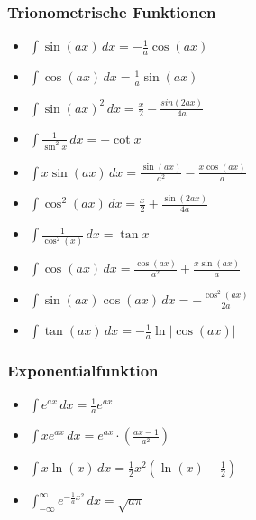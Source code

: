 \documentclass[25pt]{sciposter}
\begin{document}
\begin{multicols}{3}
\subsubsection*{Trionometrische Funktionen}
\begin{itemize}
	\item $\int \sin(ax) \,dx = -\frac{1}{a}\cos(ax)$
	\item $\int \cos(ax) \,dx = \frac{1}{a}\sin(ax)$
	\item $\int \sin(ax)^2 \,dx = \frac{x}{2} - \frac{sin(2ax)}{4a}$
	\item $\int \frac{1}{\sin^2 x} \,dx = -\cot x$
	\item $\int x \sin(ax) \,dx = \frac{\sin(ax)}{a^2} - \frac{x \cos(ax)}{a}$
	\item $\int \cos^2(ax) \,dx = \frac{x}{2} + \frac{\sin(2ax)}{4a}$
	\item $\int \frac{1}{\cos^2(x)} \,dx = \tan x$
	\item $\int \cos(ax) \,dx = \frac{\cos(ax)}{a^2} + \frac{x \sin(ax)}{a}$
	\item $\int \sin(ax) \cos(ax) \,dx = -\frac{\cos^2(ax)}{2a}$
	\item $\int \tan(ax) \,dx = - \frac{1}{a} \ln | \cos(ax) |$
\end{itemize}

\subsubsection*{Exponentialfunktion}
\begin{itemize}
	\item $\int e^{ax} \,dx = \frac{1}{a} e^{ax}$ 
	\item $\int x e^{ax} \,dx = e^{ax} \cdot \left ( \frac{ax - 1}{a^2} \right )$
	\item $\int x \ln(x) \,dx = \frac{1}{2} x^2 (\ln(x) - \frac{1}{2})$
	\item $\int_{-\infty}^\infty e^{-\frac{1}{a}x^2} \,dx = \sqrt{a \pi}$
\end{itemize}




\newpage

\end{multicols}
\end{document}
